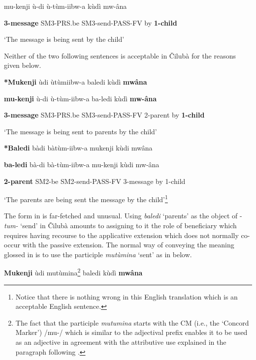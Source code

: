 \documentclass[output=paper]{langscibook}
\begin{document}
    mu-kenji    ù-di        ù-tùm-iibw-a      kùdì  mw-âna

\textbf{3-message}    SM3-PRS.be  SM3-send-PASS-FV  by    \textbf{1-child}

\glt ‘The message is being sent by the child’

Neither of the two following sentences is acceptable in Čilubà for the reasons given below.

\ea%
    \label{ex:lukusa:52}
    \z

          \textbf{*Mukenji}    ùdi        ùtùmiibw-a          baledi  kùdì    \textbf{mwâna}

      \textbf{mu-kenji}    ù-di        ù-tùm-iibw-a        ba-ledi  kùdì    \textbf{mw-âna}

  \textbf{3-message}  SM3-PRS.be  SM3-send-PASS-FV    2-parent by      \textbf{1-child}

\glt ‘The message is being sent to parents by the child’

\ea%
    \label{ex:lukusa:53}
    \z

          \textbf{*Baledi}       bàdi    bàtùm-iibw-a         mukenji       kùdi mwâna

      \textbf{ba-ledi}       bà-di     bà-tùm-iibw-a       mu-kenji     kùdi mw-âna

  \textbf{2-parent}    SM2-be  SM2-send-PASS-FV    3-message    by    1-child

\glt ‘The parents are being sent the message by the child’\footnote{Notice that there is nothing wrong in this English translation which is an acceptable English sentence.}

The form in  is far-fetched and unusual. Using \textit{baledi} ‘parents’ as the object of -\textit{tum-} ‘send’ in Čilubà amounts to assigning to it the role of beneficiary which requires having recourse to the applicative extension which does not normally co-occur with the passive extension. The normal way of conveying the meaning glossed in  is to use the participle \textit{mutùmina} ‘sent’ as in  below.

\ea%
    \label{ex:lukusa:54}
    \z

          \textbf{Mukenji}      ùdi      mutùmina\footnote{The fact that the participle \textit{mutumina} starts with the CM (i.e., the ‘Concord Marker’) /mu-/ which is similar to the adjectival prefix enables it to be used as an adjective in agreement with the attributive use explained in the paragraph following .}           baledi    kùdì  \textbf{mwâna}
\end{document}
